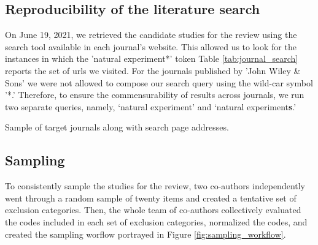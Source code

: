\subsection{Reproducibility of the literature search}

On June 19, 2021, we retrieved the candidate studies for the review using the
search tool available in each journal's website. This allowed us to look for
the instances in which the 'natural experiment*' token 
Table \ref{tab:journal_search}
reports the set of urls we visited. For the journals published by 'John Wiley \&
Sons' we were not allowed to compose our search query using the wild-car symbol '*.'
Therefore, to ensure the commensurability of results across journals, we
run two separate queries, namely, `natural experiment' and `natural
experiment\textbf{s}.'

\begin{table}
  \centering
  \sffamily
  \begin{small}
    
  \end{small}
  \label{tab:journal_search}
  \caption{Sample of target journals along with search page addresses.}
\end{table}

\subsection{Sampling}

To consistently sample the studies for the review, two co-authors independently 
went through a random sample of twenty items and created a tentative set of
exclusion categories. Then, the whole team of co-authors collectively evaluated
the codes included in each set of exclusion categories, normalized the codes,
and created the sampling worflow portrayed in Figure \ref{fig:sampling_workflow}.


